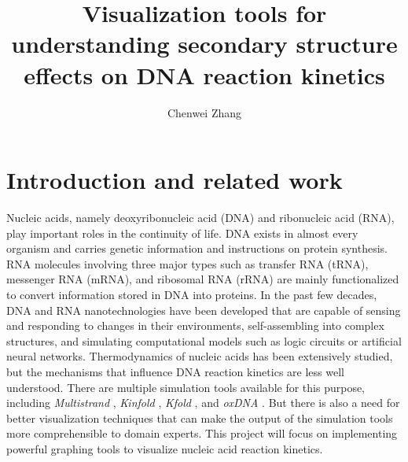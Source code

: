 \documentclass{article}
\begin{document}
	\title{Visualization tools for understanding secondary structure effects on DNA reaction kinetics \vspace{-0.7em}}
	\author{Chenwei Zhang}
	\date{}
	\maketitle
	\vspace{-3em}



\section*{Introduction and related work}

Nucleic acids, namely deoxyribonucleic acid (DNA) and ribonucleic acid (RNA), play important roles in the continuity of life. DNA exists in almost every organism and carries genetic information and instructions on protein synthesis. RNA molecules involving three major types such as transfer RNA (tRNA), messenger RNA (mRNA), and ribosomal RNA (rRNA) are mainly functionalized to convert information stored in DNA into proteins. In the past few decades, DNA and RNA nanotechnologies have been developed that are capable of sensing and responding to changes in their environments, self-assembling into complex structures, and simulating computational models such as logic circuits or artificial neural networks. Thermodynamics of nucleic acids has been extensively studied, but the mechanisms that influence DNA reaction kinetics are less well understood. There are multiple simulation tools available for this purpose, including \textit{Multistrand} \cite{Schaeffer,multistrandpaper}, \textit{Kinfold} \cite{Kinfold}, \textit{Kfold} \cite{Kfold}, and \textit{oxDNA} \cite{oxDNA}. But there is also a need for better visualization techniques that can make the output of the simulation tools more comprehensible to domain experts. This project will focus on implementing powerful graphing tools to visualize nucleic acid reaction kinetics. 
\end{document}
